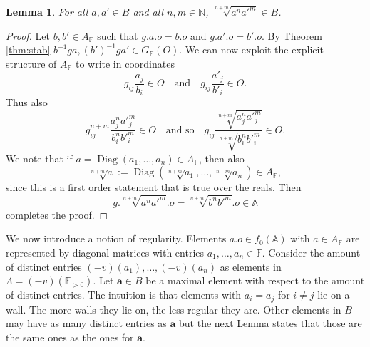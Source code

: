 \documentclass[12pt]{amsart}
\newcommand{\F}{\mathbb{F} }
\newcommand{\N}{\mathbb{N} }
\newcommand{\A}{\mathbb{A}}
\newcommand{\B}{\mathcal{B}}
\numberwithin{equation}{section}
\newtheorem{lemma}[theorem]{Lemma}
\theoremstyle{remark} %
\begin{document}
\begin{lemma}
	\label{lem:A2conv}
	For all $a,a' \in B$ and all $n,m \in \N$, $
	\sqrt[n+m]{a^n a'^m} \in B$.
\end{lemma}
\begin{proof}
	Let $b,b' \in A_\F$ such that $g.a.o = b.o$ and $g.a'.o = b'.o$. By Theorem \ref{thm:stab} $b^{-1}ga, (b')^{-1}g a' \in G_\F(O)$. We can now exploit the explicit structure of $A_\F$ to write in coordinates
	$$
	g_{ij}\frac{a_j}{b_i} \in O \quad \text{and} \quad g_{ij}\frac{a'_j}{b'_i} \in O.
	$$
	Thus also 
	$$
	g_{ij}^{n+m} \frac{a_j^n {a'}_j^m}{b_i^n {b'}_i^m} \in O \quad \text{and so}\quad
	g_{ij} \frac{\sqrt[n+m]{a_j^n {a'}_j^m}}{\sqrt[n+m]{b_i^n {b'}_i^m}} \in O.
	$$
	We note that if $a = \operatorname{Diag}\left(a_1, \ldots , a_n\right) \in A_\F$, then also 
	$$
	\sqrt[n+m]{a} :=\operatorname{Diag}(\sqrt[n+m]{a_1} , \ldots , \sqrt[n+m]{a_n}  ) \in A_\F,
	$$
	since this is a first order statement that is true over the reals. Then
	$$
	g.\sqrt[n+m]{a^n a'^m}.o = \sqrt[n+m]{b^n b'^m}.o \in \A
	$$
completes the proof.
\end{proof}

We now introduce a notion of regularity. Elements $a.o \in f_0(\A)$ with $a\in A_\F$ are represented by diagonal matrices with entries $a_1, \ldots, a_n \in \F$. Consider the amount of distinct entries $(-v)(a_1), \ldots ,(-v)(a_n)$ as elements in $\Lambda = (-v)(\F_{>0})$. %
Let $\pmb{a}\in B$ be a maximal element with respect to the amount of distinct entries. The intuition is that elements with $a_i=a_j$ for $i\neq j$ lie on a wall. The more walls they lie on, the less regular they are. %
Other elements in $B$ may have as many distinct entries as $\pmb{a}$ but the next Lemma states that those are the same ones as the ones for $\pmb{a}$. 
\end{document}
